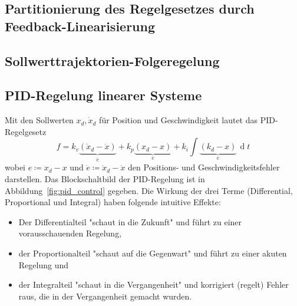 \documentclass[a4paper, 11pt, accentcolor = tud3b]{tudreport}
\DeclareMathOperator{\total}{d}
\newcommand{\dif}[1]{\,\total#1}
\begin{document}
			\subsection{Partitionierung des Regelgesetzes durch Feedback-Linearisierung} %

			\subsection{Sollwerttrajektorien-Folgeregelung} %

			\subsection{PID-Regelung linearer Systeme} %
				Mit den Sollwerten \( x_d, \dot{x}_d \) für Position und Geschwindigkeit lautet das PID-Regelgesetz
				\begin{equation*}
					f = k_v \underbrace{(\dot{x}_d - \dot{x})}_{\dot{e}} + k_p \underbrace{(x_d - x)}_{e} + k_i \int \! \underbrace{(k_d - x)}_{e} \dif{t}
				\end{equation*}
				wobei \( e \coloneqq x_d - x \) und \( \dot{e} \coloneqq \dot{x}_d - \dot{x} \) den Positions- und Geschwindigkeitsfehler darstellen. Das Blockschaltbild der PID-Regelung ist in Abbildung~\ref{fig:pid_control} gegeben. Die Wirkung der drei Terme (Differential, Proportional und Integral) haben folgende intuitive Effekte:
				\begin{itemize}
					\item Der Differentialteil "schaut in die Zukunft" und führt zu einer vorausschauenden Regelung,
					\item der Proportionalteil "schaut auf die Gegenwart" und führt zu einer akuten Regelung und
					\item der Integralteil "schaut in die Vergangenheit" und korrigiert (regelt) Fehler raus, die in der Vergangenheit gemacht wurden.
				\end{itemize}
			
\end{document}
